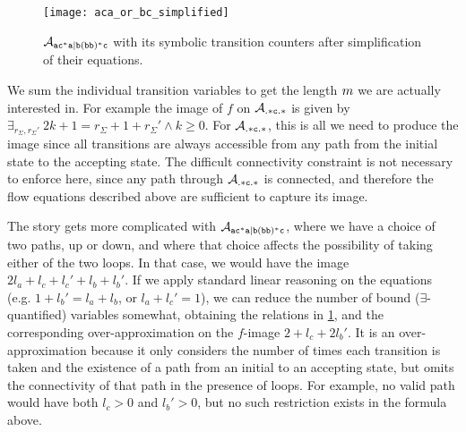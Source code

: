 \documentclass[acmsmall,review,anonymous,screen]{acmart}\settopmatter{printfolios=true,printccs=false,printacmref=true}
\theoremstyle{definition}
\begin{document}
\begin{figure}[t]
  \centering 
    \texttt{[image: aca\_or\_bc\_simplified]}
    \caption{$\mathcal{A}_{\mathtt{ac^*a|b(bb)^*c}}{}$ with its symbolic transition counters after
    simplification of their equations.}\label{fig:example-simplify-1}
  \end{figure}

We sum the individual transition variables to get the length $m$ we
are actually interested in. For example the image of $f$ on
$\mathcal{A}_{\mathtt{.*c.*}}$ is given by $\exists_{r_\Sigma, r_\Sigma'} \: 2k + 1 =
r_\Sigma + 1 + r_\Sigma' \land k \geq 0$. For $\mathcal{A}_{\mathtt{.*c.*}}{}$, this is
all we need to produce the image since all transitions are always accessible
from any path from the initial state to the accepting state. The difficult
connectivity constraint is not necessary to enforce here, since any path through
$\mathcal{A}_{\mathtt{.*c.*}}{}$ is connected, and therefore the flow equations
described above are sufficient to capture its image.

The story gets more complicated with $\mathcal{A}_{\mathtt{ac^*a|b(bb)^*c}}{}$, where we have a choice of two
paths, up or down, and where that choice affects the possibility of taking
either of the two loops. In that case, we would have the image $2l_a + l_c + l_c' + l_b + l_b'$.
If we apply standard linear reasoning on the equations (e.g. $1 + {l_b}' = l_a +
l_b$, or $l_a + l_c' = 1$), we can reduce the number of bound
($\exists$-quantified) variables somewhat, obtaining the relations in
\cref{fig:example-simplify-1}, and the corresponding over-approximation on
the $f$-image $2 + l_c + 2l_b'$. It is an over-approximation because it only
considers the number of times each transition is taken and the existence of a
path from an initial to an accepting state, but omits the connectivity of that
path in the presence of loops. For example, no valid path would have both $l_c >
0$ and $l_b' > 0$, but no such restriction exists in the formula above.
\end{document}
